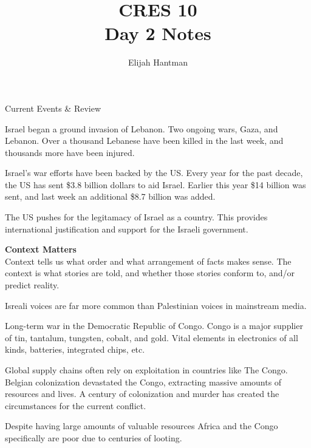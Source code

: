 \documentclass{report}
\title{\Huge{CRES 10}\\Day 2 Notes}
\author{\huge{Elijah Hantman}}
\date{}
\begin{document}
\maketitle
\newpage

{\huge Current Events \& Review}
\begin{mdframed}
    \begin{description}
        \item Israel began a ground invasion of Lebanon.
            Two ongoing wars, Gaza, and Lebanon. Over a thousand
            Lebanese have been killed in the last week, and thousands
            more have been injured.

            Israel's war efforts have been backed by the US.
            Every year for the past decade, the US has sent
            \$3.8 billion dollars to aid Israel. Earlier this
            year \$14 billion was sent, and last week an
            additional \$8.7 billion was added.

            The US pushes for the legitamacy of Israel as a
            country. This provides international justification
            and support for the Israeli government.
        \item {\large \textbf{Context Matters}}\\
            Context tells us what order and what arrangement of
            facts makes sense. The context is what stories are
            told, and whether those stories conform to, and/or
            predict reality.

            Isreali voices are far more common than Palestinian
            voices in mainstream media.

        \item Long-term war in the Democratic Republic of Congo.
            Congo is a major supplier of tin, tantalum, tungsten,
            cobalt, and gold. Vital elements in electronics of
            all kinds, batteries, integrated chips, etc.

            Global supply chains often rely on exploitation in
            countries like The Congo. Belgian colonization devastated the Congo, extracting
            massive amounts of resources and lives. A century
            of colonization and murder has created the
            circumstances for the current conflict.

            Despite having large amounts of valuable resources
            Africa and the Congo specifically are poor due to
            centuries of looting.


\end{description}
\end{mdframed}
\end{document}
